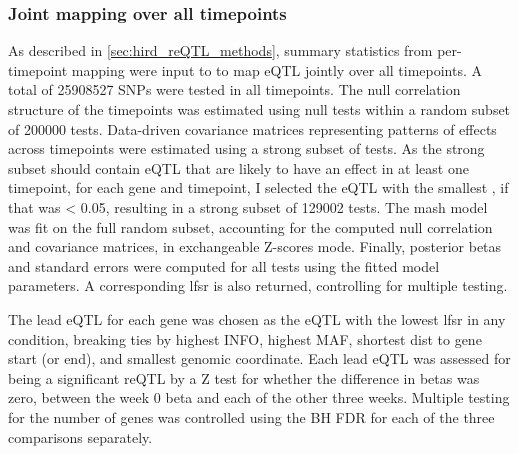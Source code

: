 \subsubsection{Joint  mapping over all timepoints}

As described in \cref{sec:hird_reQTL_methods},
summary statistics from per-timepoint mapping were input to  \autocite{urbut2018FlexibleStatisticalMethods} to map \gls{eQTL} jointly over all timepoints.
A total of \num{25908527} \glspl{SNP} were tested in all timepoints.
The null correlation structure of the timepoints was estimated using null tests within a random subset of \num{200000} tests.
Data-driven covariance matrices representing patterns of effects across timepoints were estimated using a strong subset of tests.
As the strong subset should contain \gls{eQTL} that are likely to have an effect in at least one timepoint,
for each gene and timepoint, I selected the \gls{eQTL} with the smallest \pvalue{}, if that \pvalue{} was < 0.05, resulting in a strong subset of \num{129002} tests.
The mash model was fit on the full random subset, accounting for the computed null correlation and covariance matrices, in exchangeable Z-scores mode.
Finally, posterior betas and standard errors were computed for all tests using the fitted model parameters.
A corresponding \gls{lfsr} is also returned, controlling for multiple testing.

The lead \gls{eQTL} for each gene was chosen as the \gls{eQTL} with the lowest \gls{lfsr} in any condition, 
breaking ties by highest INFO, highest \gls{MAF}, shortest dist to gene start (or end), and smallest genomic coordinate.
Each lead \gls{eQTL} was assessed for being a significant \gls{reQTL} by a Z test for whether the difference in betas was zero, between the week 0 beta and each of the other three weeks.
Multiple testing for the number of genes was controlled using the \gls{BH} \gls{FDR} for each of the three comparisons separately.


